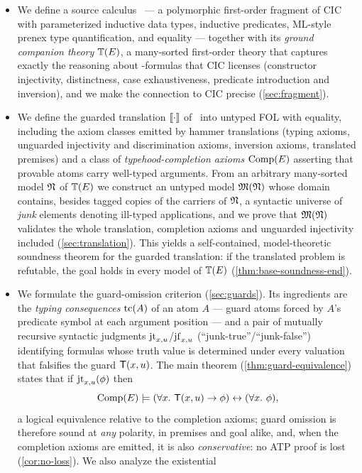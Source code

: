 \begin{itemize}
\item We define a source calculus \Frag\ --- a polymorphic first-order
  fragment of CIC with parameterized inductive data types, inductive
  predicates, ML-style prenex type quantification, and equality --- together
  with its \emph{ground companion theory} $\mathbb{T}(E)$, a many-sorted first-order
  theory that captures exactly the reasoning about \Frag-formulas that CIC
  licenses (constructor injectivity, distinctness, case exhaustiveness,
  predicate introduction and inversion), and we make the connection to CIC
  precise (\cref{sec:fragment}).
\item We define the guarded translation $[\![ \cdot ]\!]$ of \Frag\ into untyped
  FOL with equality, including the axiom classes emitted by hammer
  translations (typing axioms, unguarded injectivity and discrimination
  axioms, inversion axioms, translated premises) and a class of
  \emph{typehood-completion axioms} $\mathrm{Comp}(E)$ asserting that provable atoms
  carry well-typed arguments.  From an arbitrary many-sorted model $\mathfrak{N}$ of
  $\mathbb{T}(E)$ we construct an untyped model $\mathfrak{M}(\mathfrak{N})$ whose domain contains, besides
  tagged copies of the carriers of $\mathfrak{N}$, a syntactic universe of \emph{junk}
  elements denoting ill-typed applications, and we prove that $\mathfrak{M}(\mathfrak{N})$ validates
  the whole translation, completion axioms and unguarded injectivity included
  (\cref{sec:translation}).  This yields a self-contained, model-theoretic
  soundness theorem for the guarded translation: if the translated problem is
  refutable, the goal holds in every model of $\mathbb{T}(E)$
  (\cref{thm:base-soundness-end}).
\item We formulate the guard-omission criterion (\cref{sec:guards}).  Its
  ingredients are the \emph{typing consequences} $\mathrm{tc}(A)$ of an atom $A$ ---
  guard atoms forced by $A$'s predicate symbol at each argument position ---
  and a pair of mutually recursive syntactic judgments
  $\mathrm{jt}_{x,u}$/$\mathrm{jf}_{x,u}$ (``junk-true''/``junk-false'') identifying
  formulas whose truth value is determined under every valuation that
  falsifies the guard $\mathsf{T}(x,u)$.  The main theorem
  (\cref{thm:guard-equivalence}) states that if $\mathrm{jt}_{x,u}(\phi)$ then
  \[
    \mathrm{Comp}(E) \models (\forall x.\ \mathsf{T}(x,u) \rightarrow \phi) \leftrightarrow (\forall x.\ \phi),
  \]
  a logical equivalence relative to the completion axioms; guard omission is
  therefore sound at \emph{any} polarity, in premises and goal alike, and,
  when the completion axioms are emitted, it is also \emph{conservative}: no
  ATP proof is lost (\cref{cor:no-loss}).  We also analyze the existential

\end{itemize}
